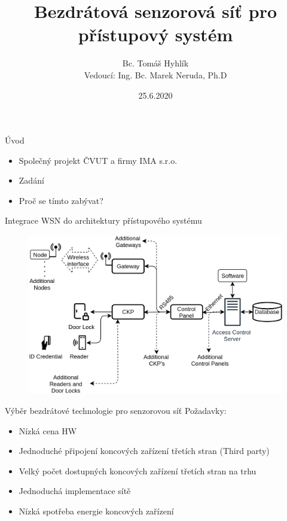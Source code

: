 \documentclass{beamer}
\title{Bezdrátová senzorová síť pro přístupový systém}
\date{25.6.2020}
\author{Bc. Tomáš Hyhlík \\
Vedoucí: Ing. Bc. Marek Neruda, Ph.D}
\institute{Katedra Mikroelektroniky}
\begin{document}
	\maketitle
  

\begin{frame}{Úvod}

	\begin{itemize}
		\item Společný projekt ČVUT a firmy IMA s.r.o. 
		\item Zadání
		\item Proč se tímto zabývat?
	\end{itemize}

\end{frame}

	

\begin{frame}{Integrace WSN do architektury přístupového systému}

	\begin{figure}[h]
		\centering
		\includegraphics[width=1\textwidth]{ACS_IoT_extension_21}
		\label{fig:ACS architecture IMA with geteway}
	\end{figure}
		
\end{frame}



\begin{frame}{Výběr bezdrátové technologie pro senzorovou síť}
	Požadavky:
	\begin{itemize}
		\item Nízká cena HW
		\item Jednoduché připojení koncových zařízení třetích stran (Third party)
		\item Velký počet dostupných koncových zařízení třetích stran na trhu 
		\item Jednoduchá implementace sítě
		\item Nízká spotřeba energie koncových zařízení
	\end{itemize}

\end{frame}
\end{document}

